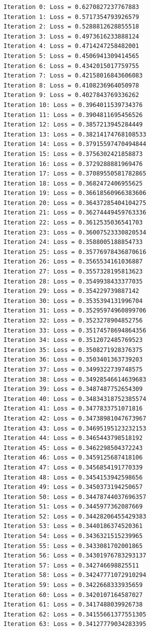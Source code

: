 \documentclass[
  letterpaper,
  DIV=11,
  numbers=noendperiod]{scrartcl}
\begin{document}
\begin{verbatim}
Iteration 0: Loss = 0.6270827237767883
Iteration 1: Loss = 0.5717354793926579
Iteration 2: Loss = 0.5288812628855518
Iteration 3: Loss = 0.4973616233888124
Iteration 4: Loss = 0.4714247258482001
Iteration 5: Loss = 0.4506941309414565
Iteration 6: Loss = 0.4342015017759755
Iteration 7: Loss = 0.42158016843606083
Iteration 8: Loss = 0.4108236964050978
Iteration 9: Loss = 0.4027843769336262
Iteration 10: Loss = 0.3964011539734376
Iteration 11: Loss = 0.3904811695456526
Iteration 12: Loss = 0.3857213945284449
Iteration 13: Loss = 0.38214174768108533
Iteration 14: Loss = 0.37915597470494844
Iteration 15: Loss = 0.3756302421858873
Iteration 16: Loss = 0.3729288881969476
Iteration 17: Loss = 0.37089550581782865
Iteration 18: Loss = 0.3682472406955625
Iteration 19: Loss = 0.36618560966383606
Iteration 20: Loss = 0.36437285404104275
Iteration 21: Loss = 0.36274449459763336
Iteration 22: Loss = 0.3612535036541703
Iteration 23: Loss = 0.36007523330820534
Iteration 24: Loss = 0.3588005188854733
Iteration 25: Loss = 0.35776978436870616
Iteration 26: Loss = 0.3565534161036887
Iteration 27: Loss = 0.3557328195813623
Iteration 28: Loss = 0.3549938433377035
Iteration 29: Loss = 0.354229739887142
Iteration 30: Loss = 0.3535394131996704
Iteration 31: Loss = 0.35295974960899706
Iteration 32: Loss = 0.3523278904852756
Iteration 33: Loss = 0.35174578694864356
Iteration 34: Loss = 0.3512072485769523
Iteration 35: Loss = 0.3508271928376375
Iteration 36: Loss = 0.3503401363739203
Iteration 37: Loss = 0.3499322739748575
Iteration 38: Loss = 0.34928546614639683
Iteration 39: Loss = 0.3487487752654309
Iteration 40: Loss = 0.34834318752385574
Iteration 41: Loss = 0.3477833751071816
Iteration 42: Loss = 0.34738981047673967
Iteration 43: Loss = 0.34695195123232153
Iteration 44: Loss = 0.3465443798518192
Iteration 45: Loss = 0.3462298504372243
Iteration 46: Loss = 0.3459125687418106
Iteration 47: Loss = 0.3456854191770339
Iteration 48: Loss = 0.3454153942598656
Iteration 49: Loss = 0.3450373194250657
Iteration 50: Loss = 0.34478744037696357
Iteration 51: Loss = 0.3445977362087669
Iteration 52: Loss = 0.34428206455429383
Iteration 53: Loss = 0.3440186374520361
Iteration 54: Loss = 0.3436321515239965
Iteration 55: Loss = 0.3433081702001865
Iteration 56: Loss = 0.34301976783293137
Iteration 57: Loss = 0.342746698825511
Iteration 58: Loss = 0.34247771072910294
Iteration 59: Loss = 0.3422668333935659
Iteration 60: Loss = 0.3420107164587027
Iteration 61: Loss = 0.3417488039926738
Iteration 62: Loss = 0.34155661377551305
Iteration 63: Loss = 0.34127779034283395

\end{verbatim}
\end{document}
